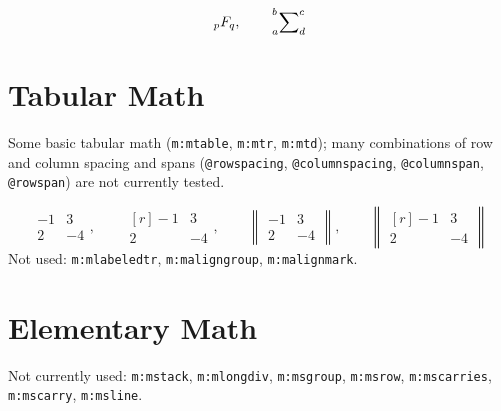 \documentclass{article}
\makeatletter
\newcommand{\mml}[1]{\texttt{m:#1}}
\newcommand{\attr}[1]{\texttt{@#1}}
\makeatother
\begin{document}
\begin{equation}
 {}_p F_q,\qquad
 \sideset{_a^b}{^c_d}{\sum}
\end{equation}

\section{Tabular Math}
Some basic tabular math (\mml{mtable}, \mml{mtr}, \mml{mtd});
many combinations of row and column spacing and spans
(\attr{rowspacing}, \attr{columnspacing}, \attr{columnspan}, \attr{rowspan})
are not currently tested.

\begin{equation}
  \begin{matrix} -1 & 3 \\ 2 & -4 \end{matrix}
,\qquad
  \begin{matrix*}[r] -1 & 3 \\ 2 & -4 \end{matrix*}
,\qquad
  \begin{Vmatrix} -1 & 3 \\ 2 & -4 \end{Vmatrix}
,\qquad
  \begin{Vmatrix*}[r] -1 & 3 \\ 2 & -4 \end{Vmatrix*}
\end{equation}
Not used: \mml{mlabeledtr}, \mml{maligngroup}, \mml{malignmark}.

\section{Elementary Math}
Not currently used:
\mml{mstack}, \mml{mlongdiv}, \mml{msgroup}, \mml{msrow},
\mml{mscarries}, \mml{mscarry}, \mml{msline}.
\end{document}
